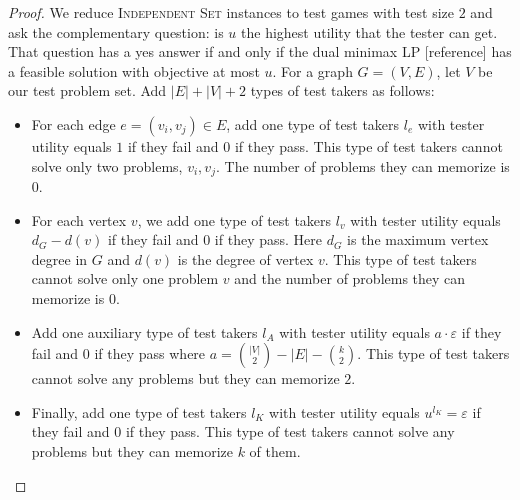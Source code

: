 \documentclass{article}
\begin{document}
\begin{proof}
We reduce \textsc{Independent Set} instances to test games with test size $2$
and ask the complementary question: is $u$ the highest utility that the tester
can get. That question has a yes answer if and only if the dual minimax LP
[reference] has a feasible solution with objective at most $u$. For a graph $G
= (V, E)$, let $V$ be our test problem set. Add $|E|+|V|+2$ types of test
takers as follows:

\begin{itemize}

\item For each edge $e = (v_i, v_j) \in E$, add one type of test takers $l_e$
with tester utility equals $1$ if they fail and $0$ if they pass. This type of
test takers cannot solve only two problems, $v_i, v_j$. The number of problems
they can memorize is 0.

\item For each vertex $v$, we add one type of test takers $l_v$ with tester utility
equals $d_G-d(v)$ if they fail and 0 if they pass. Here $d_G$ is the maximum
vertex degree in $G$ and $d(v)$ is the degree of vertex $v$. This type of test
takers cannot solve only one problem $v$ and the number of problems they can
memorize is 0.

\item Add one auxiliary type of test takers $l_A$ with tester utility equals
$a \cdot \varepsilon$ if they fail and $0$ if they pass where $a =
\binom{|V|}{2}-|E|-\binom{k}{2}$. This type of test takers cannot solve any
problems but they can memorize $2$.

\item Finally, add one type of test takers $l_K$ with tester utility equals
$u^{l_K} = \varepsilon$ if they fail and $0$ if they pass. This type of test
takers cannot solve any problems but they can memorize $k$ of them.

\end{itemize}


\end{proof}
\end{document}
